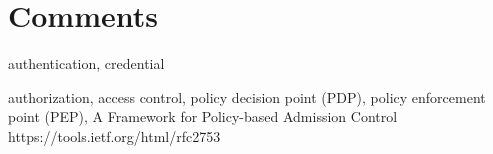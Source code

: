 
\section{Comments}
\begin{sloppypar}
    authentication, 
    credential
\end{sloppypar}
\begin{sloppypar}
    authorization, 
    access control, 
    policy decision point (PDP), 
    policy enforcement point (PEP), 
    A Framework for Policy-based Admission Control https://tools.ietf.org/html/rfc2753
\end{sloppypar}







